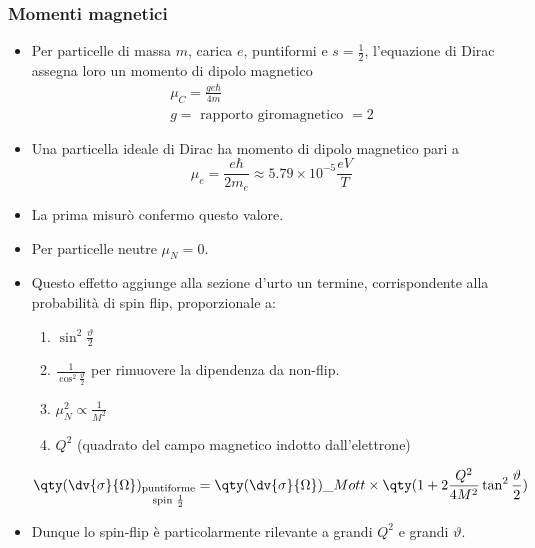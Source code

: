 \subsubsection{Momenti magnetici}
\begin{itemize}
    \item Per particelle di massa $m$, carica $e$, puntiformi e $s=\frac12$, l'equazione di Dirac assegna loro un momento di dipolo magnetico
    \begin{gather*}
    \mu_C=\frac{ge\hbar}{4m}\\
    g=\text{ rapporto giromagnetico }=2
    \end{gather*}
    \item Una particella ideale di Dirac ha momento di dipolo magnetico pari a 
    \[
    \mu_e=\frac{e\hbar}{2m_e}\approx 5.79\times10^{-5}\frac{eV}T
    \]
    \item La prima misurò confermo questo valore.
    \item Per particelle neutre $\mu_N=0$.
    \item Questo effetto aggiunge alla sezione d'urto un termine, corrispondente alla probabilità di spin flip, proporzionale a: 
    \begin{enumerate}
    \item $\sin^2\frac\vartheta2$
    \item $\frac1{\cos^2\frac\vartheta2}$ per rimuovere la dipendenza da non-flip.
    \item $\mu_N^2\propto\frac1 {M^2}$
    \item $Q^2$ (quadrato del campo magnetico indotto dall'elettrone)
    \end{enumerate}
    \begin{equation*}
        \qty(\dv{\sigma}{\Omega})_{\begin{subarray}{c}
            \text{puntiforme}\\
            \text{spin }\frac12
         \end{subarray}}=\qty(\dv{\sigma}{\Omega})\_{Mott}\times\qty(1+2\frac{Q^2}{4M^2}\tan^2\frac\vartheta2)
    \end{equation*}
    \item Dunque lo spin-flip è particolarmente rilevante a grandi $Q^2$ e grandi $\vartheta$.
\end{itemize}
